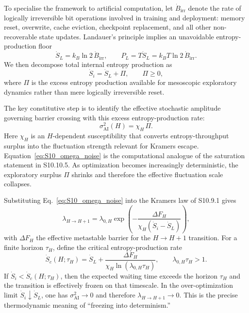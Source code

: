 \documentclass[11pt]{article}
\begin{document}
To specialise the framework to artificial computation, let
$\dot B_{\mathrm{irr}}$ denote the rate of logically irreversible bit
operations involved in training and deployment: memory reset, overwrite,
cache eviction, checkpoint replacement, and all other non-recoverable
state updates.
Landauer's principle implies an unavoidable entropy-production floor
\begin{equation}
\dot S_L = k_B\ln 2\,\dot B_{\mathrm{irr}},
\qquad
P_L = T\dot S_L = k_B T\ln 2\,\dot B_{\mathrm{irr}}.
\end{equation}
We then decompose total internal entropy production as
\begin{equation}
\dot S_i = \dot S_L + \Pi,
\qquad
\Pi\ge 0,
\end{equation}
where $\Pi$ is the excess entropy production available for mesoscopic
exploratory dynamics rather than mere logically irreversible reset.

The key constitutive step is to identify the effective stochastic amplitude
governing barrier crossing with this excess entropy-production rate:
\begin{equation}
\sigma_{\mathrm{AI}}^2(H)=\chi_H\,\Pi.
\label{eq:S10_omega_noise}
\end{equation}
Here $\chi_H$ is an $H$-dependent susceptibility that converts
entropy-throughput surplus into the fluctuation strength relevant for
Kramers escape.
Equation~\eqref{eq:S10_omega_noise} is the computational analogue of the
saturation statement in S10.10.5.
As optimization becomes increasingly deterministic, the exploratory surplus
$\Pi$ shrinks and therefore the effective fluctuation scale collapses.

Substituting Eq.~\eqref{eq:S10_omega_noise} into the Kramers law of
S10.9.1 gives
\begin{equation}
\lambda_{H\to H+1}
=
\lambda_{0,H}
\exp\!\left(
-\frac{\Delta F_H}{\chi_H(\dot S_i-\dot S_L)}
\right),
\label{eq:S10_omega_kramers}
\end{equation}
with $\Delta F_H$ the effective metastable barrier for the
$H\to H+1$ transition.
For a finite horizon $\tau_H$, define the critical entropy-production rate
\begin{equation}
\dot S_c(H;\tau_H)
=
\dot S_L+\frac{\Delta F_H}{\chi_H\ln(\lambda_{0,H}\tau_H)},
\qquad
\lambda_{0,H}\tau_H>1.
\label{eq:S10_omega_Sc}
\end{equation}
If $\dot S_i<\dot S_c(H;\tau_H)$, then the expected waiting time exceeds the
horizon $\tau_H$ and the transition is effectively frozen on that
timescale.
In the over-optimization limit $\dot S_i\downarrow \dot S_L$, one has
$\sigma_{\mathrm{AI}}^2\to 0$ and therefore
$\lambda_{H\to H+1}\to 0$.
This is the precise thermodynamic meaning of ``freezing into determinism.''
\end{document}
